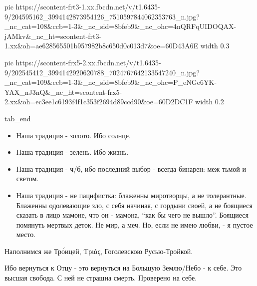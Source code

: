      pic https://scontent-frt3-1.xx.fbcdn.net/v/t1.6435-9/204595162_3994142873954126_7510597844062353763_n.jpg?_nc_cat=108&ccb=1-3&_nc_sid=8bfeb9&_nc_ohc=4nQRFqUIDOQAX-jAMkv&_nc_ht=scontent-frt3-1.xx&oh=ae628565501b957982b8c650d0c013d7&oe=60D43A6E
     width 0.3

     pic https://scontent-frx5-2.xx.fbcdn.net/v/t1.6435-9/202545412_3994142920620788_7024767642133547240_n.jpg?_nc_cat=109&ccb=1-3&_nc_sid=8bfeb9&_nc_ohc=P_eNGe6YK-YAX_nJ3nQ&_nc_ht=scontent-frx5-2.xx&oh=ec3ee1c6193f4f1c353f2694d89ccd90&oe=60D2DC1F
     width 0.2

  tab_end
\fi

\begin{itemize}
  \item Наша традиция - золото. Ибо солнце.
  \item Наша традиция - зелень. Ибо жизнь.
  \item Наша традиция - ч/б, ибо последний выбор - всегда бинарен: меж тьмой и светом.
  \item Наша традиция - не пацифистка: блаженны миротворцы, а не толерантные. Блаженны одолевающие зло, с себя начиная, с гордыни своей, а не боящиеся сказать в лицо мамоне, что он - мамона, \enquote{как бы чего не вышло}. Боящиеся помянуть мертвых деток. Не мир, а меч. Но, если не имею любви, - я пустое место.
\end{itemize}

Наполнимся же Тро́ицей, Τριάς, Гоголевскою Русью-Тройкой.

Ибо вернуться к Отцу - это вернуться на Большую Землю/Небо - к себе. Это высшая
свобода. С ней не страшна смерть. Проверено на себе.
